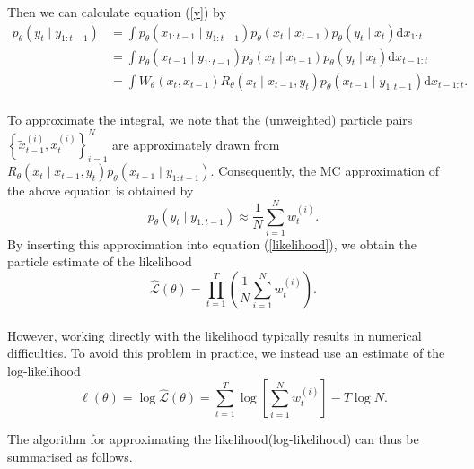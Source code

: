 \documentclass[mstat,12pt]{unswthesis}  %
\numberwithin{equation}{section}
\begin{document}
\noindent Then we can calculate equation (\ref{y}) by \\
\begin{equation}\begin{aligned}
    p_{\theta}\left(y_{t} \mid y_{1: t-1}\right)&=
    \int p_{\theta}\left(x_{1:t-1} \mid y_{1:t-1}\right)
    p_{\theta}\left(x_{t} \mid x_{t-1}\right) p_{\theta}\left(y_{t} \mid x_{t}\right) \mathrm{d} x_{1:t}\\
    &=
   \int p_{\theta}\left(x_{t-1} \mid y_{1: t-1}\right)p_{\theta}\left(x_{t} \mid x_{t-1}\right) p_{\theta}\left(y_{t} \mid x_{t}\right) \mathrm{d} x_{t-1: t} \\
   &=\int W_{\theta}\left(x_{t}, x_{t-1}\right) R_{\theta}\left(x_{t} \mid x_{t-1}, y_{t}\right) p_{\theta}\left(x_{t-1} \mid y_{1: t-1}\right) \mathrm{d} x_{t-1: t}.
\end{aligned}\end{equation}\\

\noindent To approximate the integral, we note that
the (unweighted) particle pairs $\left\{\widetilde{x}_{t-1}^{(i)}, x_{t}^{(i)}\right\}_{i=1}^{N}$ are approximately
drawn from $R_{\theta}\left(x_{t} \mid x_{t-1}, y_{t}\right) p_{\theta}\left(x_{t-1} \mid y_{1: t-1}\right)$.
Consequently,
 the MC approximation of the above equation is obtained by
\begin{equation}p_{\theta}\left(y_{t} \mid y_{1: t-1}\right) \approx \frac{1}{N} \sum_{i=1}^{N} w_{t}^{(i)}.\end{equation}
\noindent By inserting this approximation into equation (\ref{likelihood}),  we obtain the
particle estimate of the likelihood
\begin{equation}\widehat{\mathcal{L}}(\theta)=\prod_{t=1}^{T}\left(\frac{1}{N} \sum_{i=1}^{N} w_{t}^{(i)}\right).\end{equation}\\
\noindent However, working directly with the likelihood typically
results in numerical difficulties. To avoid this problem in practice, we instead use an estimate of the log-likelihood
\begin{equation}\widehat{\ell}(\theta)=\log \widehat{\mathcal{L}}(\theta)=\sum_{t=1}^{T} \log \left[\sum_{i=1}^{N} w_{t}^{(i)}\right]-T \log N.\end{equation}

\noindent The algorithm for approximating the likelihood(log-likelihood) can thus be summarised as follows.\\
\end{document}
